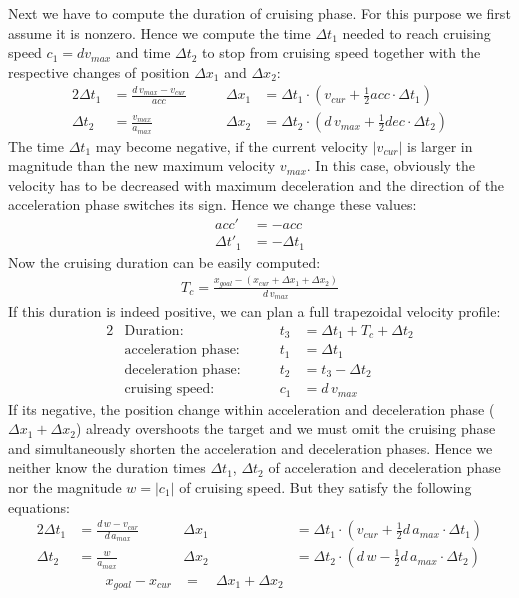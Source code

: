 \documentclass[11pt,english]{article}
\newcommand{\xc}{x_{cur}}
\newcommand{\xg}{x_{goal}}
\newcommand{\vc}{v_{cur}}
\newcommand{\vm}{v_{max}}
\newcommand{\am}{a_{max}}
\newcommand{\half}{\frac{1}{2}}
\newcommand{\abs}[1]{|#1|}
\begin{document}
Next we have to compute the duration of cruising phase. For this purpose we
first assume it is nonzero. Hence we compute the time $\Delta t_1$ needed to
reach cruising speed $c_1 = d \vm$ and time $\Delta t_2$ to stop from cruising
speed together with the respective changes of position $\Delta x_1$ and
$\Delta x_2$:
\begin{alignat*}{2}
  \Delta t_1 &= \frac{d \, \vm - \vc}{acc} &\qquad
  \Delta x_1 &= \Delta t_1 \cdot (\vc + \half acc \cdot \Delta t_1) \\
  \Delta t_2 &= \frac{\vm}{\am} &\qquad
  \Delta x_2 &= \Delta t_2 \cdot (d \, \vm + \half dec \cdot \Delta t_2)
\end{alignat*}
The time $\Delta t_1$ may become negative, if the current velocity $|\vc|$ is
larger in magnitude than the new maximum velocity $\vm$. In this case, obviously the velocity has to be decreased with maximum deceleration and the direction of the acceleration phase switches its sign. Hence we change these values:
\begin{align*}
  acc' &= -acc \\
  \Delta t'_1 &= - \Delta t_1
\end{align*}
Now the cruising duration can be easily computed:
\begin{align*}
  T_c = \frac{\xg - (\xc + \Delta x_1 + \Delta x_2)}{d \, \vm}
\end{align*}
If this duration is indeed positive, we can plan a full trapezoidal velocity
profile:
\begin{alignat*}{2}
  &\text{Duration:} &\qquad t_3 &= \Delta t_1 + T_c + \Delta t_2 \\
  &\text{acceleration phase:} &\qquad t_1 &= \Delta t_1\\
  &\text{deceleration phase:} &\qquad t_2 &= t_3 - \Delta t_2\\
  &\text{cruising speed:} &\qquad c_1 &= d \, \vm
\end{alignat*}
If its negative, the position change within acceleration and deceleration
phase ($\Delta x_1 + \Delta x_2$) already overshoots the target and we must
omit the cruising phase and simultaneously shorten the acceleration and
deceleration phases. Hence we neither know the duration times $\Delta t_1$,
$\Delta t_2$ of acceleration and deceleration phase nor the magnitude $w =
\abs{c_1}$ of cruising speed. But they satisfy the following equations:
\begin{alignat*}{2}
  \Delta t_1 &= \frac{d \, w - \vc}{d \, \am} \qquad&
  \Delta x_1 &= \Delta t_1 \cdot (\vc + \half d \, \am \cdot \Delta t_1) \\
  \Delta t_2 &= \frac{w}{\am} \qquad&
  \Delta x_2 &= \Delta t_2 \cdot (d \, w - \half d \, \am \cdot \Delta t_2) \\
  &\qquad \xg - \xc &=\quad \Delta x_1 + \Delta x_2
\end{alignat*}
\end{document}
